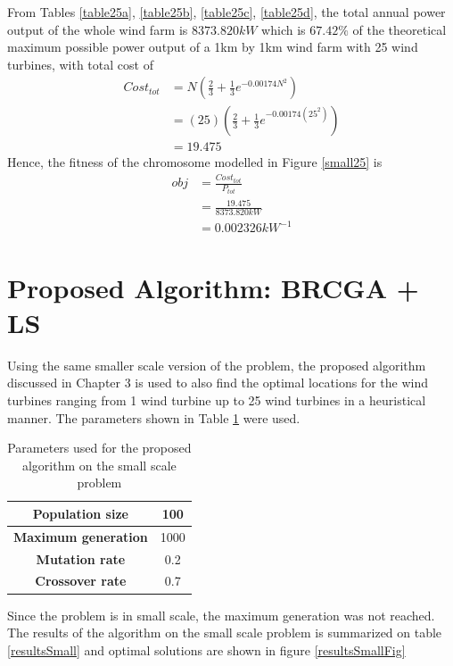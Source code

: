         From Tables \ref{table25a}, \ref{table25b}, \ref{table25c}, \ref{table25d}, the total annual power output of the whole wind farm is $8373.820kW$ which is $67.42\%$ of the theoretical maximum possible power output of a 1km by 1km wind farm with 25 wind turbines, with total cost of
        \begin{align*}
            Cost_{tot}
            &= N\left(\frac{2}{3} + \frac{1}{3}e^{-0.00174N^2}\right) \\
            &= \left(25\right)\left(\frac{2}{3} + \frac{1}{3}e^{-0.00174\left(25^2\right)}\right) \\
            &=19.475
        \end{align*}
        Hence, the fitness of the chromosome modelled in Figure \ref{small25} is
        \begin{align*}
            obj
            &=\frac{Cost_{tot}}{P_{tot}} \\
            &=\frac{19.475}{8373.820kW} \\
            &=0.002326kW^{-1}
        \end{align*} 
        
\section{Proposed Algorithm: BRCGA + LS}
    Using the same smaller scale version of the problem, the proposed algorithm discussed in Chapter 3 is used to also find the optimal locations for the wind turbines ranging from 1 wind turbine up to 25 wind turbines in a heuristical manner. The parameters shown in Table \ref{parametersGA} were used.
    
    \begin{table}[h]
        \centering
        \begin{tabular}{|c|c|} \hline
            \textbf{Population size} &100 \\ \hline
            \textbf{Maximum generation} &1000 \\ \hline
            \textbf{Mutation rate} &0.2 \\ \hline
            \textbf{Crossover rate} &0.7 \\
            \hline
        \end{tabular}
        \caption{Parameters used for the proposed algorithm on the small scale problem}
        \label{parametersGA}
    \end{table}
    
    Since the problem is in small scale, the maximum generation was not reached. The results of the algorithm on the small scale problem is summarized on table \ref{resultsSmall} and optimal solutions are shown in figure \ref{resultsSmallFig}
    
